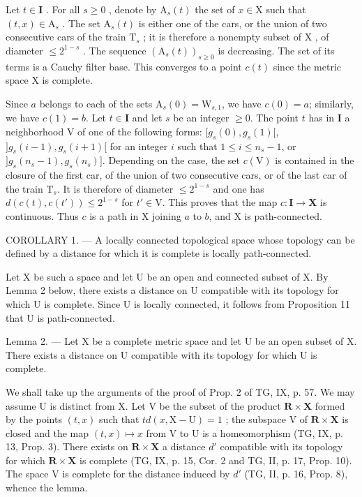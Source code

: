 Let \(t \in \mathbf{I}\) . For all \(s \geqslant 0\) , denote by \(\mathrm{A}_s(t)\) the set of \(x \in \mathrm{X}\) such that \((t, x) \in \mathrm{A}_s\) . The set \(\mathrm{A}_s(t)\) is either one of the cars, or the union of two consecutive cars of the train \(\mathrm{T}_s\) ; it is therefore a nonempty subset of \(\mathrm{X}\) , of diameter \(\leqslant 2^{1-s}\) . The sequence \((\mathrm{A}_s(t))_{s \geqslant 0}\) is decreasing. The set of its terms is a Cauchy filter base. This converges to a point \(c(t)\) since the metric space \(\mathrm{X}\) is complete.

Since \(a\) belongs to each of the sets \(\mathrm{A}_s(0) = \mathrm{W}_{s,1}\), we have \(c(0) = a\); similarly, we have \(c(1) = b\). Let \(t \in \mathbf{I}\) and let \(s\) be an integer \(\geqslant 0\). The point \(t\) has in \(\mathbf{I}\) a neighborhood V of one of the following forms: \([g_s(0), g_s(1)[\), \(]g_s(i - 1), g_s(i + 1)[\) for an integer \(i\) such that \(1 \leqslant i \leqslant n_s - 1\), or \(]g_s(n_s - 1), g_s(n_s)]\). Depending on the case, the set \(c(\mathrm{V})\) is contained in the closure of the first car, of the union of two consecutive cars, or of the last car of the train \(\mathrm{T}_s\). It is therefore of diameter \(\leqslant 2^{1-s}\) and one has \(d(c(t), c(t')) \leqslant 2^{1-s}\) for \(t' \in \mathrm{V}\). This proves that the map \(c\colon \mathbf{I} \to \mathbf{X}\) is continuous. Thus \(c\) is a path in X joining \(a\) to \(b\), and X is path-connected.

COROLLARY 1. --- A locally connected topological space whose topology can be defined by a distance for which it is complete is locally path-connected.

Let X be such a space and let U be an open and connected subset of X. By Lemma 2 below, there exists a distance on U compatible with its topology for which U is complete. Since U is locally connected, it follows from Proposition 11 that U is path-connected.

Lemma 2. --- Let X be a complete metric space and let U be an open subset of X. There exists a distance on U compatible with its topology for which U is complete.

We shall take up the arguments of the proof of Prop. 2 of TG, IX, p. 57. We may assume U is distinct from X. Let V be the subset of the product \(\mathbf{R} \times \mathbf{X}\) formed by the points \((t,x)\) such that \(td(x,\mathrm{X}-\mathrm{U})=1\) ; the subspace V of \(\mathbf{R} \times \mathbf{X}\) is closed and the map \((t,x) \mapsto x\) from V to U is a homeomorphism (TG, IX, p. 13, Prop. 3). There exists on \(\mathbf{R} \times \mathbf{X}\) a distance \(d'\) compatible with its topology for which \(\mathbf{R} \times \mathbf{X}\) is complete (TG, IX, p. 15, Cor. 2 and TG, II, p. 17, Prop. 10). The space V is complete for the distance induced by \(d'\) (TG, II, p. 16, Prop. 8), whence the lemma.

